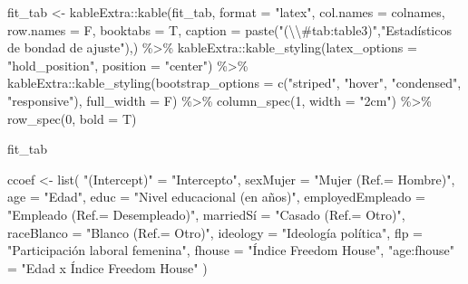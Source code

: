 \documentclass[
  12pt,
  a4paper,
]{article}
\newenvironment{Shaded}{\begin{snugshade}}{\end{snugshade}}
\newcommand{\AttributeTok}[1]{\textcolor[rgb]{0.77,0.63,0.00}{#1}}
\newcommand{\DecValTok}[1]{\textcolor[rgb]{0.00,0.00,0.81}{#1}}
\newcommand{\FunctionTok}[1]{\textcolor[rgb]{0.00,0.00,0.00}{#1}}
\newcommand{\NormalTok}[1]{#1}
\newcommand{\OtherTok}[1]{\textcolor[rgb]{0.56,0.35,0.01}{#1}}
\newcommand{\SpecialCharTok}[1]{\textcolor[rgb]{0.00,0.00,0.00}{#1}}
\newcommand{\StringTok}[1]{\textcolor[rgb]{0.31,0.60,0.02}{#1}}
\begin{document}
\begin{Shaded}
\begin{Highlighting}[]
\NormalTok{fit\_tab }\OtherTok{\textless{}{-}}\NormalTok{ kableExtra}\SpecialCharTok{::}\FunctionTok{kable}\NormalTok{(fit\_tab, }
                             \AttributeTok{format =} \StringTok{"latex"}\NormalTok{, }
                             \AttributeTok{col.names =}\NormalTok{ colnames,}
                             \AttributeTok{row.names =}\NormalTok{ F,}
                             \AttributeTok{booktabs =}\NormalTok{ T, }
                             \AttributeTok{caption =} \FunctionTok{paste}\NormalTok{(}\StringTok{"(}\SpecialCharTok{\textbackslash{}\textbackslash{}}\StringTok{\#tab:table3)"}\NormalTok{,}\StringTok{"Estadísticos de bondad de ajuste"}\NormalTok{),) }\SpecialCharTok{\%\textgreater{}\%} 
\NormalTok{  kableExtra}\SpecialCharTok{::}\FunctionTok{kable\_styling}\NormalTok{(}\AttributeTok{latex\_options =} \StringTok{"hold\_position"}\NormalTok{, }
                            \AttributeTok{position =} \StringTok{"center"}\NormalTok{) }\SpecialCharTok{\%\textgreater{}\%}
\NormalTok{  kableExtra}\SpecialCharTok{::}\FunctionTok{kable\_styling}\NormalTok{(}\AttributeTok{bootstrap\_options =} \FunctionTok{c}\NormalTok{(}\StringTok{"striped"}\NormalTok{, }\StringTok{"hover"}\NormalTok{, }\StringTok{"condensed"}\NormalTok{, }\StringTok{"responsive"}\NormalTok{), }\AttributeTok{full\_width =}\NormalTok{ F) }\SpecialCharTok{\%\textgreater{}\%} 
  \FunctionTok{column\_spec}\NormalTok{(}\DecValTok{1}\NormalTok{, }\AttributeTok{width =} \StringTok{"2cm"}\NormalTok{) }\SpecialCharTok{\%\textgreater{}\%}
  \FunctionTok{row\_spec}\NormalTok{(}\DecValTok{0}\NormalTok{, }\AttributeTok{bold =}\NormalTok{ T)}

\NormalTok{fit\_tab}


\NormalTok{ccoef }\OtherTok{\textless{}{-}} \FunctionTok{list}\NormalTok{(}
  \StringTok{"(Intercept)"} \OtherTok{=} \StringTok{"Intercepto"}\NormalTok{,}
  \AttributeTok{sexMujer =} \StringTok{"Mujer (Ref.= Hombre)"}\NormalTok{,}
  \AttributeTok{age =} \StringTok{"Edad"}\NormalTok{,}
  \AttributeTok{educ =} \StringTok{"Nivel educacional (en años)"}\NormalTok{,}
  \AttributeTok{employedEmpleado =} \StringTok{"Empleado (Ref.= Desempleado)"}\NormalTok{,}
\NormalTok{  marriedSí }\OtherTok{=} \StringTok{"Casado (Ref.= Otro)"}\NormalTok{,}
  \AttributeTok{raceBlanco =} \StringTok{"Blanco (Ref.= Otro)"}\NormalTok{,}
  \AttributeTok{ideology =} \StringTok{"Ideología política"}\NormalTok{,}
  \AttributeTok{flp =} \StringTok{"Participación laboral femenina"}\NormalTok{,}
  \AttributeTok{fhouse =} \StringTok{"Índice Freedom House"}\NormalTok{,}
  \StringTok{"age:fhouse"} \OtherTok{=} \StringTok{"Edad x Índice Freedom House"}
\NormalTok{)}



\end{Highlighting}
\end{Shaded}
\end{document}
